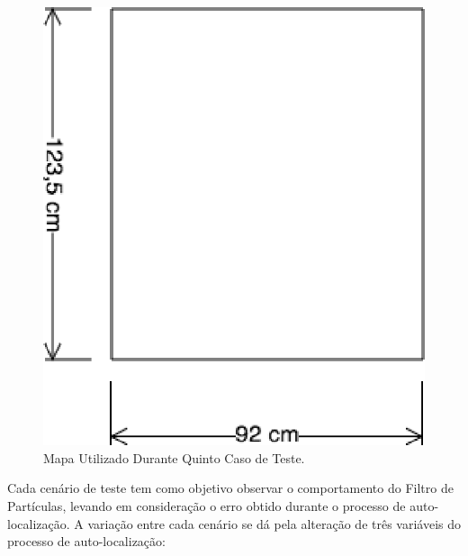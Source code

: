 \begin{figure}[H]
	\centering
	\includegraphics[scale=0.9]{figuras/mapa_quadrado.eps}
	\caption{Mapa Utilizado Durante Quinto Caso de Teste.}
	\label{img:mapa_quadrado}
\end{figure}

Cada cenário de teste tem como objetivo observar o comportamento do Filtro de Partículas, levando em consideração o erro obtido
durante o processo de auto-localização. A variação entre cada cenário se dá pela alteração de três variáveis do processo de auto-localização:

